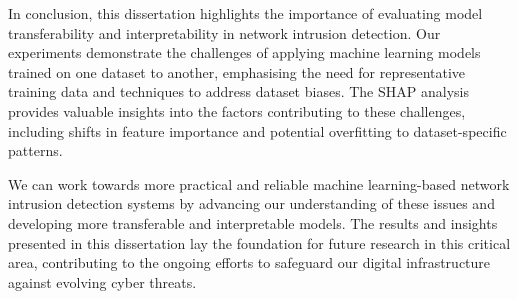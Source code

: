 In conclusion, this dissertation highlights the importance of evaluating model transferability and interpretability in network intrusion detection. Our experiments demonstrate the challenges of applying machine learning models trained on one dataset to another, emphasising the need for representative training data and techniques to address dataset biases. The SHAP analysis provides valuable insights into the factors contributing to these challenges, including shifts in feature importance and potential overfitting to dataset-specific patterns.

We can work towards more practical and reliable machine learning-based network intrusion detection systems by advancing our understanding of these issues and developing more transferable and interpretable models. The results and insights presented in this dissertation lay the foundation for future research in this critical area, contributing to the ongoing efforts to safeguard our digital infrastructure against evolving cyber threats.


